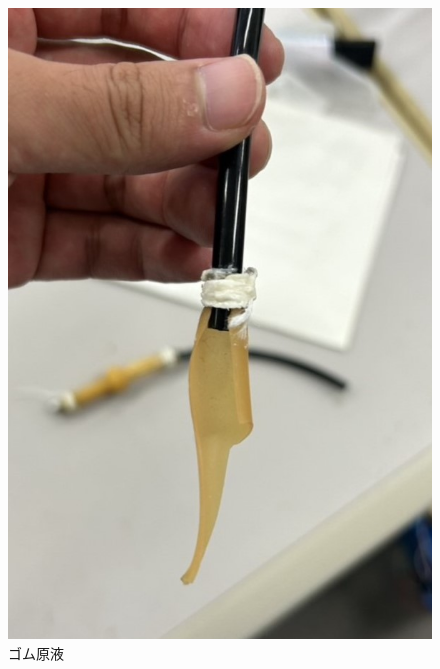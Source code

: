 \begin{figure}[h]
  \begin{minipage}{0.33\hsize}
    \centering
    \includegraphics[scale=0.3]{pic/5.jpg}
    \caption{ゴム原液}
    \label{fig:gen}
  \end{minipage}  
  \begin{minipage}{0.33\hsize}
      \centering

\end{minipage}
\end{figure}
